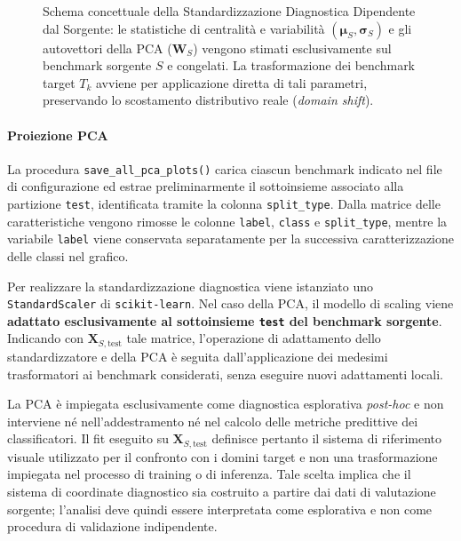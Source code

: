 \begin{figure}[H]
\begin{tikzpicture}
\end{tikzpicture}
\caption{Schema concettuale della Standardizzazione Diagnostica Dipendente dal Sorgente: le statistiche di centralità e variabilità $(\boldsymbol{\mu}_S, \boldsymbol{\sigma}_S)$ e gli autovettori della PCA ($\mathbf{W}_S$) vengono stimati esclusivamente sul benchmark sorgente $S$ e congelati. La trasformazione dei benchmark target $T_k$ avviene per applicazione diretta di tali parametri, preservando lo scostamento distributivo reale (\textit{domain shift}).}
\label{fig:source_dependent_standardization_flow}
\end{figure}

\paragraph{Proiezione PCA}

La procedura \texttt{save\_all\_pca\_plots()} carica ciascun benchmark indicato nel file di configurazione ed estrae preliminarmente il sottoinsieme associato alla partizione \texttt{test}, identificata tramite la colonna \texttt{split\_type}. 
Dalla matrice delle caratteristiche vengono rimosse le colonne \texttt{label}, \texttt{class} e \texttt{split\_type}, mentre la variabile \texttt{label} viene conservata separatamente per la successiva caratterizzazione delle classi nel grafico.

Per realizzare la standardizzazione diagnostica viene istanziato uno \texttt{StandardScaler} di \newline \texttt{scikit-learn}. 
Nel caso della PCA, il modello di scaling viene \textbf{adattato esclusivamente al sottoinsieme \texttt{test} del benchmark sorgente}. 
Indicando con $\mathbf{X}_{S,\mathrm{test}}$ tale matrice, l'operazione di adattamento dello standardizzatore e della PCA è seguita dall'applicazione dei medesimi trasformatori ai benchmark considerati, senza eseguire nuovi adattamenti locali.

La PCA è impiegata esclusivamente come diagnostica esplorativa \textit{post-hoc} e non interviene né nell'addestramento né nel calcolo delle metriche predittive dei classificatori. Il fit eseguito su $\mathbf{X}_{S,\mathrm{test}}$ definisce pertanto il sistema di riferimento visuale utilizzato per il confronto con i domini target e non una trasformazione impiegata nel processo di training o di inferenza. Tale scelta implica che il sistema di coordinate diagnostico sia costruito a partire dai dati di valutazione sorgente; l'analisi deve quindi essere interpretata come esplorativa e non come procedura di validazione indipendente.

